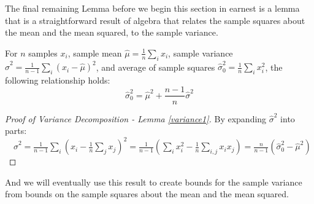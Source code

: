 The final remaining Lemma before we begin this section in earnest is a lemma that is a straightforward result of algebra that relates the sample squares about the mean and the mean squared, to the sample variance.
\begin{lemma}\label{variance1}
For $n$ samples $x_i$, sample mean $\hat{\mu} = \frac{1}{n}\sum_ix_i$, sample variance $\hat{\sigma}^2=\frac{1}{n-1}\sum_i(x_i-\hat{\mu})^2$, and average of sample squares $\hat{\sigma}_0^2 = \frac{1}{n}\sum_ix_i^2$, the following relationship holds:
\[ 
\hat{\sigma}_0^2=\hat{\mu}^2+\frac{n-1}{n}\hat{\sigma}^2
\]
\end{lemma}
\begin{proof}[Proof of Variance Decomposition - Lemma \ref{variance1}]
By expanding $\hat{\sigma}^2$ into parts:\\
\(\quad\hat{\sigma}^2=\frac{1}{n-1}\sum_i\left(x_i-\frac{1}{n}\sum_jx_j \right)^2 
=\frac{1}{n-1}\left(\sum_ix_i^2-\frac{1}{n}\sum_{i,j}x_ix_j \right) = \frac{n}{n-1}\left(\hat{\sigma}_0^2-\hat{\mu}^2\right)\)
\end{proof}

And we will eventually use this result to create bounds for the sample variance from bounds on the sample squares about the mean and the mean squared.

